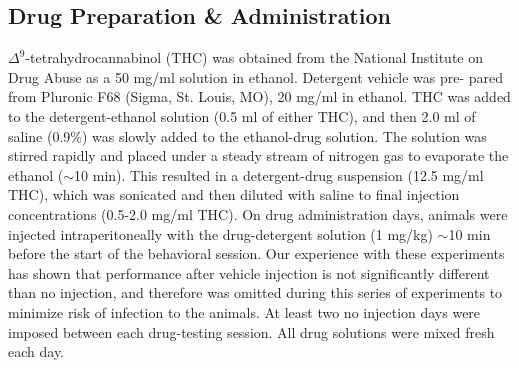 \documentclass[11pt,a4paper,final]{article}
\begin{document}
    \subsection{Drug Preparation \& Administration}
$\Delta^9$-tetrahydrocannabinol (THC) was obtained from the National Institute on Drug Abuse as a 50 mg/ml solution in ethanol.
Detergent vehicle was pre- pared from Pluronic F68 (Sigma, St. Louis, MO), 20 mg/ml in ethanol.
THC was added to the detergent-ethanol solution (0.5 ml of either THC), and then 2.0 ml of saline (0.9\%) was slowly added to the ethanol-drug solution.
The solution was stirred rapidly and placed under a steady stream of nitrogen gas to evaporate the ethanol ($\sim$10 min).
This resulted in a detergent-drug suspension (12.5 mg/ml THC), which was sonicated and then diluted with saline to final injection concentrations (0.5-2.0 mg/ml THC).
On drug administration days, animals were injected intraperitoneally with the drug-detergent solution (1 mg/kg) $\sim$10 min before the start of the behavioral session.
Our experience with these experiments has shown that performance after vehicle injection is not significantly different than no injection, and therefore was omitted during this series of experiments to minimize risk of infection to the animals.
At least two no injection days were imposed between each drug-testing session. All drug solutions were mixed fresh each day.
\end{document}
